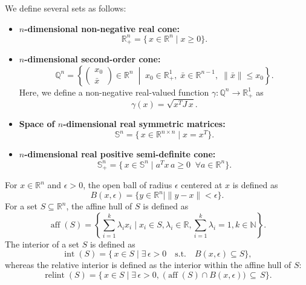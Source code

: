 We define several sets as follows:
\begin{itemize}
    \item 
    \textbf{$n$-dimensional non-negative real cone:} \\
    \[
      \mathbb{R}^n_+ 
      = \{\,x \in \mathbb{R}^n \mid x \geq 0 \}.
    \]

    \item 
    \textbf{$n$-dimensional second-order cone:} \\
    \[
      \mathbb{Q}^n 
      = \left\{ \begin{pmatrix} x_0 \\ \bar{x} \end{pmatrix} \in \mathbb{R}^n 
         \;\middle|\; x_0 \in \mathbb{R}^1_+, \; \bar{x} \in \mathbb{R}^{n-1}, \; \|\bar{x}\| \le x_0 \right\}.
    \]
    Here, we define a non-negative real-valued function $\gamma : \mathbb{Q}^n \to \mathbb{R}^1_+$ as
    \[
      \gamma(x) = \sqrt{x^T J\, x}.
    \]

    \item 
    \textbf{Space of $n$-dimensional real symmetric matrices:} \\
    \[
      \mathbb{S}^n = \{\, x \in \mathbb{R}^{n \times n} \mid x = x^T \}.
    \]

    \item 
    \textbf{$n$-dimensional real positive semi-definite cone:} \\
    \[
      \mathbb{S}^n_+ 
      = \{\, x \in \mathbb{S}^n \mid a^T x\, a \ge 0 \;\; \forall a \in \mathbb{R}^n \}.
    \]
\end{itemize}

For $x \in \mathbb{R}^n$ and $\epsilon > 0$, the open ball of radius $\epsilon$ centered at $x$ is defined as
\[
  B(x, \epsilon) = \{ y \in \mathbb{R}^n \mid \|y - x\| < \epsilon \}.
\]
For a set $S \subseteq \mathbb{R}^n$, the affine hull of $S$ is defined as
\[
  \operatorname{aff}(S) = \left\{ \sum_{i=1}^k \lambda_i x_i \mid x_i \in S, \lambda_i \in \mathbb{R}, \sum_{i=1}^k \lambda_i = 1, k \in \mathbb{N} \right\}.
\]
The interior of a set $S$ is defined as
\[
  \operatorname{int}(S) 
  = \{\, x \in S \mid \exists\, \epsilon > 0 \quad \text{s.t.} \quad B(x, \epsilon) \subseteq S \},
\]
whereas the relative interior is defined as the interior within the affine hull of $S$:
\[
\operatorname{relint}(S)
=\{\,
x \in S 
\mid \exists\, \epsilon > 0,\; \bigl(\operatorname{aff}(S)\cap B(x,\epsilon)\bigr)\,\subseteq\,S
\}.
\]
